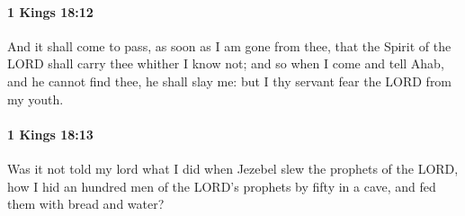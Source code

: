 		\paragraph{1 Kings 18:12} %
			\label{1KINGS-18-12}

			And it shall come to pass, as soon as I am gone from thee, that the Spirit of the LORD shall carry thee whither I know not; and so when I come and tell Ahab, and he cannot find thee, he shall slay me: but I thy servant fear the LORD from my youth.


		\paragraph{1 Kings 18:13} %
			\label{1KINGS-18-13}

			Was it not told my lord what I did when Jezebel slew the prophets of the LORD, how I hid an hundred men of the LORD’s prophets by fifty in a cave, and fed them with bread and water?

